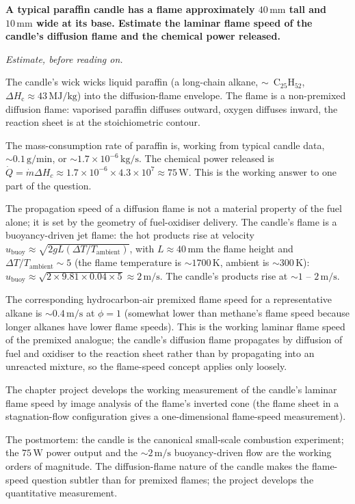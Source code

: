 \begin{estimation}
\textbf{A typical paraffin candle has a flame approximately $40\,\text{mm}$
tall and $10\,\text{mm}$ wide at its base. Estimate the laminar flame
speed of the candle's diffusion flame and the chemical power released.}

\smallskip
\textit{Estimate, before reading on.}

\smallskip
The candle's wick wicks liquid paraffin (a long-chain alkane,
$\sim$~C$_{25}$H$_{52}$, $\Delta H_{\text{c}} \approx 43\,\text{MJ}/
\text{kg}$) into the diffusion-flame envelope. The flame is a
non-premixed diffusion flame: vaporised paraffin diffuses outward,
oxygen diffuses inward, the reaction sheet is at the stoichiometric
contour.

The mass-consumption rate of paraffin is, working from typical
candle data, $\sim 0.1\,\text{g}/\text{min}$, or $\sim 1.7 \times
10^{-6}\,\text{kg}/\text{s}$. The chemical power released is
$\dot{Q} = \dot{m} \Delta H_c \approx 1.7 \times 10^{-6} \times 4.3
\times 10^7 \approx 75\,\text{W}$. This is the working answer to one
part of the question.

The propagation speed of a diffusion flame is not a material property
of the fuel alone; it is set by the geometry of fuel-oxidiser delivery.
The candle's flame is a buoyancy-driven jet flame: the hot products
rise at velocity $u_{\text{buoy}} \approx \sqrt{2 g L (\Delta T /
T_{\text{ambient}})}$, with $L \approx 40\,\text{mm}$ the flame
height and $\Delta T / T_{\text{ambient}} \sim 5$ (the flame
temperature is $\sim 1700\,\si{\kelvin}$, ambient is $\sim 300\,
\si{\kelvin}$): $u_{\text{buoy}} \approx \sqrt{2 \times 9.81 \times
0.04 \times 5} \approx 2\,\text{m}/\text{s}$. The candle's products
rise at $\sim 1$ -- $2\,\text{m}/\text{s}$.

The corresponding hydrocarbon-air premixed flame speed for a
representative alkane is $\sim 0.4\,\text{m}/\text{s}$ at $\phi = 1$
(somewhat lower than methane's flame speed because longer alkanes
have lower flame speeds). This is the working laminar flame speed of
the premixed analogue; the candle's diffusion flame propagates by
diffusion of fuel and oxidiser to the reaction sheet rather than by
propagating into an unreacted mixture, so the flame-speed concept
applies only loosely.

The chapter project develops the working measurement of the
candle's laminar flame speed by image analysis of the flame's
inverted cone (the flame sheet in a stagnation-flow configuration
gives a one-dimensional flame-speed measurement).

The postmortem: the candle is the canonical small-scale combustion
experiment; the $75\,\text{W}$ power output and the $\sim 2\,\text{m}/
\text{s}$ buoyancy-driven flow are the working orders of magnitude.
The diffusion-flame nature of the candle makes the flame-speed
question subtler than for premixed flames; the project develops the
quantitative measurement.
\end{estimation}

